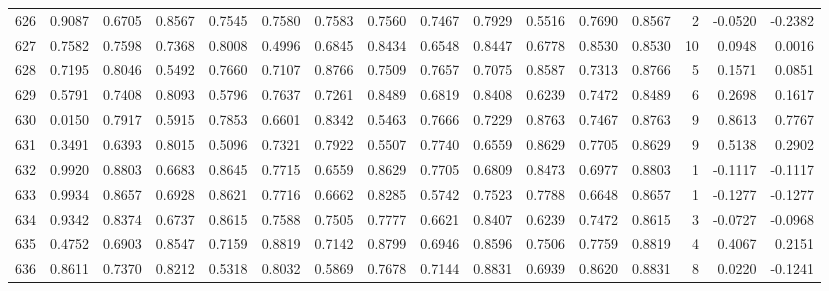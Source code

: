 \begin{tabular}{lrrrrrrrrrrrrrrr}
626 &      0.9087 &  0.6705 &  0.8567 &  0.7545 &  0.7580 &  0.7583 &  0.7560 &  0.7467 &  0.7929 &  0.5516 &   0.7690 &     0.8567 &      2 &                   -0.0520 &                    -0.2382 \\
627 &      0.7582 &  0.7598 &  0.7368 &  0.8008 &  0.4996 &  0.6845 &  0.8434 &  0.6548 &  0.8447 &  0.6778 &   0.8530 &     0.8530 &     10 &                    0.0948 &                     0.0016 \\
628 &      0.7195 &  0.8046 &  0.5492 &  0.7660 &  0.7107 &  0.8766 &  0.7509 &  0.7657 &  0.7075 &  0.8587 &   0.7313 &     0.8766 &      5 &                    0.1571 &                     0.0851 \\
629 &      0.5791 &  0.7408 &  0.8093 &  0.5796 &  0.7637 &  0.7261 &  0.8489 &  0.6819 &  0.8408 &  0.6239 &   0.7472 &     0.8489 &      6 &                    0.2698 &                     0.1617 \\
630 &      0.0150 &  0.7917 &  0.5915 &  0.7853 &  0.6601 &  0.8342 &  0.5463 &  0.7666 &  0.7229 &  0.8763 &   0.7467 &     0.8763 &      9 &                    0.8613 &                     0.7767 \\
631 &      0.3491 &  0.6393 &  0.8015 &  0.5096 &  0.7321 &  0.7922 &  0.5507 &  0.7740 &  0.6559 &  0.8629 &   0.7705 &     0.8629 &      9 &                    0.5138 &                     0.2902 \\
632 &      0.9920 &  0.8803 &  0.6683 &  0.8645 &  0.7715 &  0.6559 &  0.8629 &  0.7705 &  0.6809 &  0.8473 &   0.6977 &     0.8803 &      1 &                   -0.1117 &                    -0.1117 \\
633 &      0.9934 &  0.8657 &  0.6928 &  0.8621 &  0.7716 &  0.6662 &  0.8285 &  0.5742 &  0.7523 &  0.7788 &   0.6648 &     0.8657 &      1 &                   -0.1277 &                    -0.1277 \\
634 &      0.9342 &  0.8374 &  0.6737 &  0.8615 &  0.7588 &  0.7505 &  0.7777 &  0.6621 &  0.8407 &  0.6239 &   0.7472 &     0.8615 &      3 &                   -0.0727 &                    -0.0968 \\
635 &      0.4752 &  0.6903 &  0.8547 &  0.7159 &  0.8819 &  0.7142 &  0.8799 &  0.6946 &  0.8596 &  0.7506 &   0.7759 &     0.8819 &      4 &                    0.4067 &                     0.2151 \\
636 &      0.8611 &  0.7370 &  0.8212 &  0.5318 &  0.8032 &  0.5869 &  0.7678 &  0.7144 &  0.8831 &  0.6939 &   0.8620 &     0.8831 &      8 &                    0.0220 &                    -0.1241 \\

\end{tabular}
